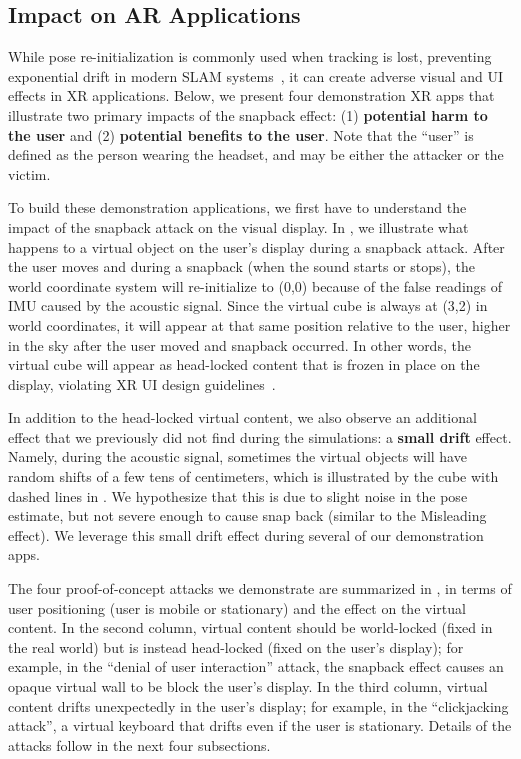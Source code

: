 \subsection{Impact on AR Applications} %
While pose re-initialization is commonly used when tracking is lost, preventing exponential drift in modern SLAM systems~\cite{campos2021orb}, it can create adverse visual and UI effects in XR applications.
Below, we present four demonstration XR apps that illustrate two primary impacts of the snapback effect: (1) \textbf{potential harm to the user} and (2) \textbf{potential benefits to the user}. Note that the ``user'' is defined as the person wearing the headset, and may be either the attacker or the victim. 




To build these demonstration applications, we first have to understand the impact of the snapback attack on the visual display.
In , we illustrate what happens to a virtual object on the user's display during a snapback attack.
After the user moves and during a snapback (when the sound starts or stops), the world coordinate system will re-initialize to (0,0) because of the false readings of IMU caused by the acoustic signal. 
Since the virtual cube is always at (3,2) in world coordinates, it will appear at that same position relative to the user, \ie higher in the sky after the user moved and snapback occurred.
In other words, the virtual cube will appear as head-locked content that is frozen in place on the display, violating XR UI design guidelines~\cite{lebeck2017securing}.

In addition to the head-locked virtual content, we also observe an additional effect that we previously did not find during the simulations: a \textbf{small drift} effect.
Namely, during the acoustic signal, sometimes the virtual objects will have random shifts of a few tens of centimeters, which is illustrated by the cube with dashed lines in . 
We hypothesize that this is due to slight noise in the pose estimate, but not severe enough to cause snap back (similar to the Misleading effect).
We leverage this small drift effect during several of our demonstration apps.


The four proof-of-concept attacks we demonstrate are summarized in , in terms of user positioning (user is mobile or stationary) and the effect on the virtual content.
In the second column, virtual content should be world-locked (fixed in the real world) but is instead head-locked (fixed on the user's display); for example, in the ``denial of user interaction'' attack, the snapback effect causes an opaque virtual wall to be block the user's display.
In the third column, virtual content drifts unexpectedly in the user's display; for example, in the ``clickjacking attack'', a virtual keyboard that drifts even if the user is stationary.
Details of the attacks follow in the next four subsections.


